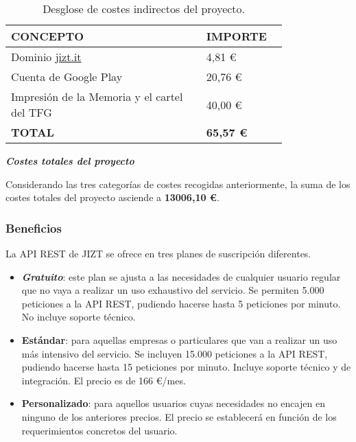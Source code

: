 \begin{table}[h!]
	\centering
	\begin{tabular}{>{\raggedright}b{0.6\linewidth}>{\raggedleft\arraybackslash}b{0.2\linewidth}}
		\toprule
		\textbf{{\scriptsize CONCEPTO}}  & \textbf{{\scriptsize IMPORTE}} \\
		\midrule
		\small{\; Dominio \href{https://www.jizt.it}{jizt.it}} & \small{4,81 €} \\
		\small{\; Cuenta de Google Play} & \small{20,76 €} \\
		\small{\; Impresión de la Memoria y el cartel del TFG} & \small{40,00 €} \\
		\bottomrule
		\textbf{{\scriptsize TOTAL}}  & \textbf{\small 65,57 €} \\
		\bottomrule
	\end{tabular}
	\caption{Desglose de costes indirectos del proyecto.}
\end{table}

\noindent
\textbf{\emph{Costes totales del proyecto}}

Considerando las tres categorías de costes recogidas anteriormente, la suma de los costes totales del proyecto asciende a \textbf{13006,10 €}.

\newpage

\subsubsection{Beneficios}

La API REST de JIZT se ofrece en tres planes de suscripción diferentes.

\vspace{-0.3cm}
\begin{itemize}[\textbullet]
	\item \textbf{\emph{Gratuito}}: este plan se ajusta a las necesidades de cualquier usuario regular que no vaya a realizar un uso exhaustivo del servicio. Se permiten 5.000 peticiones a la API REST, pudiendo hacerse hasta 5 peticiones por minuto. No incluye soporte técnico.
	
	\item \textbf{Estándar}: para aquellas empresas o particulares que van a realizar un uso más intensivo del servicio. Se incluyen 15.000 peticiones a la API REST, pudiendo hacerse hasta 15 peticiones por minuto. Incluye soporte técnico y de integración. El precio es de 166 €/mes.
	
	\item \textbf{Personalizado}: para aquellos usuarios cuyas necesidades no encajen en ninguno de los anteriores precios. El precio se establecerá en función de los requerimientos concretos del usuario.
\end{itemize}

